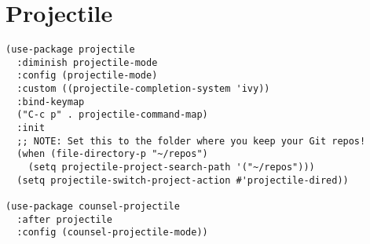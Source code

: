 \documentclass[11pt]{article}
\begin{document}
\section{Projectile}
\label{sec:org09b16da}
\begin{verbatim}
(use-package projectile
  :diminish projectile-mode
  :config (projectile-mode)
  :custom ((projectile-completion-system 'ivy))
  :bind-keymap
  ("C-c p" . projectile-command-map)
  :init
  ;; NOTE: Set this to the folder where you keep your Git repos!
  (when (file-directory-p "~/repos")
    (setq projectile-project-search-path '("~/repos")))
  (setq projectile-switch-project-action #'projectile-dired))

(use-package counsel-projectile
  :after projectile
  :config (counsel-projectile-mode))
\end{verbatim}
\end{document}
